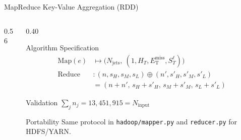 \documentclass[aspectratio=169]{beamer}
\newcommand{\met}{E_{\mathrm{T}}^{\mathrm{miss}}}
\newcommand{\HT}{H_{T}}
\newcommand{\STlep}{S_{T}^{\ell}}
\newcommand{\njet}{N_{\mathrm{jets}}}
\begin{document}
\begin{frame}{MapReduce Key-Value Aggregation (RDD)}
\begin{columns}[T]
\begin{column}{0.56\textwidth}
    \end{column}
    \begin{column}{0.40\textwidth}
      \begin{block}{Algorithm Specification}
        \tiny
        \begin{align*}
          \text{Map}(e) &\mapsto \bigl(\njet,\ (1,\HT,\met,\STlep)\bigr)\\
          \text{Reduce} &: (n,s_H,s_M,s_L)\oplus(n',s'_H,s'_M,s'_L)\\
          &= (n{+}n',\,s_H{+}s'_H,\,s_M{+}s'_M,\,s_L{+}s'_L)
        \end{align*}
      \end{block}
      \vspace{0.05cm}
      \begin{exampleblock}{Validation}
        \tiny $\sum_j n_j = 13{,}451{,}915 = N_{\text{input}}$ \checkmark
      \end{exampleblock}
      \vspace{0.05cm}
      \begin{block}{Portability}
        \tiny Same protocol in \texttt{hadoop/mapper.py} and \texttt{reducer.py} for HDFS/YARN.
      \end{block}
    \end{column}
  \end{columns}
\end{frame}

\end{document}
